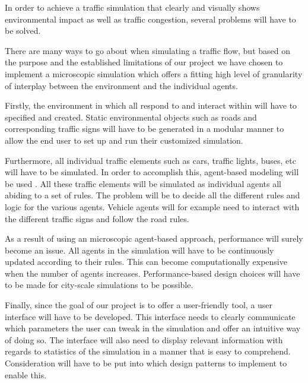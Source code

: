 In order to achieve a traffic simulation that clearly and visually shows environmental impact as well as traffic congestion, several problems will have to be solved.

There are many ways to go about when simulating a traffic flow, but based on the purpose and the established limitations of our project we have chosen to implement a microscopic simulation which offers a fitting high level of granularity of interplay between the environment and the individual agents. 

Firstly, the environment in which all  respond to and interact within will have to specified and created. Static environmental objects such as roads and corresponding traffic signs will have to be generated in a modular manner to allow the end user to set up and run their customized simulation. 

Furthermore, all individual traffic elements such as cars, traffic lights, buses, etc will have to be simulated. In order to accomplish this, agent-based modeling will be used \cite{agent-based-modeling}. All these traffic elements will be simulated as individual agents all abiding to a set of rules. The problem will be to decide all the different rules and logic for the various agents. Vehicle agents will for example need to interact with the different traffic signs and follow the road rules.  

As a result of using an microscopic agent-based approach, performance will surely become an issue. All agents in the simulation will have to be continuously updated according to their rules. This can become computationally expensive when the number of agents increases. Performance-based design choices will have to be made for city-scale simulations to be possible.

Finally, since the goal of our project is to offer a user-friendly tool, a user interface will have to be developed. This interface needs to clearly communicate which parameters the user can tweak in the simulation and offer an intuitive way of doing so. The interface will also need to display relevant information with regards to statistics of the simulation in a manner that is easy to comprehend. Consideration will have to be put into which design patterns to implement to enable this. 